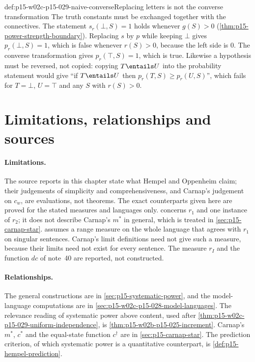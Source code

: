 \begin{hbwarning}{def:p15-w02c-p15-029-naive-converse}{Replacing letters is not the converse transformation}
The truth constants must be exchanged together with the connectives.
The statement \(s_r(\bot,S)=1\) holds whenever \(g(S)>0\)
(\cref{thm:p15-power-strength-boundary}). Replacing \(s\) by \(p\) while
keeping \(\bot\) gives \(p_r(\bot,S)=1\), which is false whenever
\(r(S)>0\), because the left side is \(0\). The converse transformation
gives \(p_r(\top,S)=1\), which is true. Likewise a hypothesis must be
reversed, not copied: copying \(T\entails U\) into the probability
statement would give ``if \(T\entails U\) then
\(p_r(T,S)\ge p_r(U,S)\)'', which fails for \(T=\bot\), \(U=\top\) and
any \(S\) with \(r(S)>0\).
\end{hbwarning}

\section{Limitations, relationships and sources}
\label{sec:p15-w02c-p15-029-limits}

\paragraph{Limitations.}
The source reports in this chapter state what Hempel and Oppenheim claim;
their judgements of simplicity and comprehensiveness, and Carnap's
judgement on \(c_w\), are evaluations, not theorems. The exact
counterparts given here are proved for the stated measures and languages
only.  concerns \(r_1\)
and one instance of \(r_2\); it does not describe Carnap's \(m^\ast\) in
general, which is treated in \cref{sec:p15-carnap-star}.
 assumes a range measure on the
whole language that agrees with \(r_1\) on singular sentences. Carnap's
limit definitions need not give such a measure, because their limits
need not exist for every sentence. The measure \(r_I\) and the function
\(dc\) of note~40 are reported, not constructed.

\paragraph{Relationships.}
The general constructions are in \cref{sec:p15-systematic-power}, and
the model-language computations are in
\cref{sec:p15-w02c-p15-028-model-languages}. The relevance reading of
systematic power above content, used after
\cref{thm:p15-w02c-p15-029-uniform-independence}, is
\cref{thm:p15-w02b-p15-025-increment}. Carnap's \(m^\ast\), \(c^\ast\)
and the equal-state function \(c^\dagger\) are in
\cref{sec:p15-carnap-star}. The prediction criterion, of which
systematic power is a quantitative counterpart, is
\cref{def:p15-hempel-prediction}.

